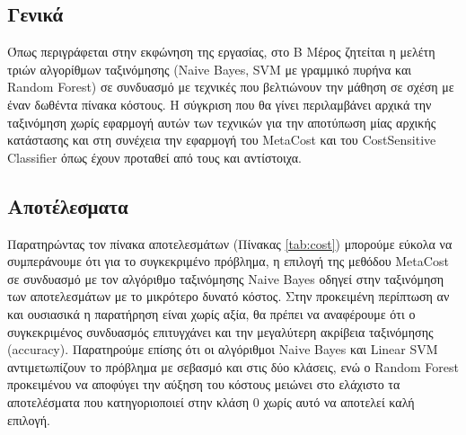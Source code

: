 \subsection{Γενικά}
Όπως περιγράφεται στην εκφώνηση της εργασίας, στο Β Μέρος ζητείται η μελέτη τριών αλγορίθμων ταξινόμησης (Naive Bayes, SVM με γραμμικό πυρήνα και Random Forest) σε συνδυασμό με τεχνικές που βελτιώνουν την μάθηση σε σχέση με έναν δωθέντα πίνακα κόστους. Η σύγκριση που θα γίνει περιλαμβάνει αρχικά την ταξινόμηση χωρίς εφαρμογή αυτών των τεχνικών για την αποτύπωση μίας αρχικής κατάστασης και στη συνέχεια την εφαρμογή του MetaCost  και του CostSensitive Classifier όπως έχουν προταθεί από τους \citep{metacost} και \citep{costsensitive} αντίστοιχα. 

\subsection{Αποτέλεσματα}
Παρατηρώντας τον πίνακα αποτελεσμάτων (Πίνακας \ref{tab:cost}) μπορούμε εύκολα να συμπεράνουμε ότι για το συγκεκριμένο πρόβλημα, η επιλογή της μεθόδου MetaCost σε συνδυασμό με τον αλγόριθμο ταξινόμησης Naive Bayes οδηγεί στην ταξινόμηση των αποτελεσμάτων με το μικρότερο δυνατό κόστος. Στην προκειμένη περίπτωση αν και ουσιασικά η παρατήρηση είναι χωρίς αξία, θα πρέπει να αναφέρουμε ότι ο συγκεκριμένος συνδυασμός επιτυγχάνει και την μεγαλύτερη ακρίβεια ταξινόμησης (accuracy). Παρατηρούμε επίσης ότι οι αλγόριθμοι Naive Bayes και Linear SVM αντιμετωπίζουν το πρόβλημα με σεβασμό και στις δύο κλάσεις, ενώ ο Random Forest προκειμένου να αποφύγει την αύξηση του κόστους μειώνει στο ελάχιστο τα αποτελέσματα που κατηγοριοποιεί στην κλάση 0 χωρίς αυτό να αποτελεί καλή επιλογή. 


